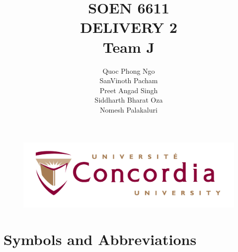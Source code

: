 \documentclass[11pt]{article}
\begin{document}
\begin{figure}
    \centering
    \includegraphics[width=14cm]{Concordia-logo.jpeg}
    \label{fig:Concordia}
\end{figure}

\title{SOEN 6611 \\ \vspace{\baselineskip}  DELIVERY 2 \\ Team J}
\author{%
  Quoc Phong Ngo \\
  SanVinoth Pacham   \\
  Preet Angad Singh  \\
  Siddharth Bharat Oza   \\
  Nomesh Palakaluri
}



\maketitle

\pagebreak
\tableofcontents

\pagebreak

\section*{Symbols and Abbreviations}
\end{document}
